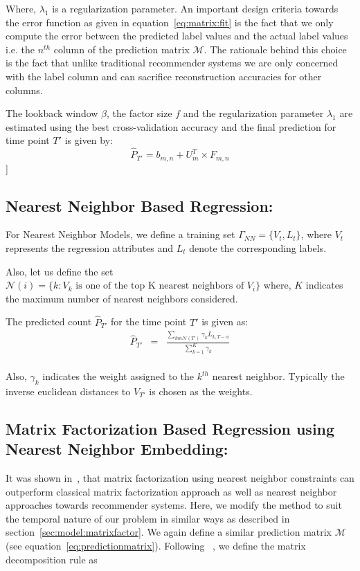 Where, $\lambda_1$ is a regularization parameter. An important design criteria towards
the error function as given in equation~\ref{eq:matrix:fit} is the fact that we only compute the error
between the predicted label values and the actual label values i.e. the $n^{th}$ column of the prediction 
matrix $\mathcal{M}$. The rationale behind this choice is the fact that unlike traditional recommender 
systems we are only concerned with the label column and can sacrifice reconstruction accuracies for other 
columns. 

The lookback window $\beta$, the factor size $f$ and the regularization parameter $\lambda_1$ 
are estimated using the best cross-validation accuracy 
and the final prediction for time point $T'$ is given by:
\[\widehat{P}_{T'} = b_{m,n} + U_m^T \times F_{m,n} \]]

\subsection{\label{sec:model:nearestneighbor} Nearest Neighbor Based Regression:}
For Nearest Neighbor Models, we define a training set $\Gamma_{NN}
= \lbrace V_t, L_t \rbrace$, where $V_t$ represents the regression attributes
and $L_t$ denote the corresponding labels.

Also, let us define the set 
$\mathcal{N}(i) = \lbrace k : \mbox{$V_k$ is one of the top  K nearest neighbors of $V_{i}$} \rbrace$ 
where, $K$ indicates the maximum number of nearest neighbors considered.


The predicted count $\widehat{P}_{T'}$ for the time point $T'$ is given as:
\begin{equation} \label{eq:nearestneighbor:pred}
  \begin{array}{lcl}
    \widehat{P}_{T'} & = & \frac{\sum\limits_{k in \mathcal{N}(T')} \gamma_{k}L_{k,T - \alpha}}
    {\sum\limits_{k=1}^{K} \gamma_{k}}\\
  \end{array}
\end{equation}

Also, $\gamma_k$ indicates the weight assigned to the $k^{th}$ nearest neighbor.
Typically the inverse euclidean distances to $V_{T'}$ is chosen as the weights.

\subsection{\label{sec:model:nearestmatrix} Matrix Factorization Based
Regression using Nearest Neighbor Embedding:}
It was shown in~\cite{koren2008factor},  that matrix factorization using nearest neighbor constraints can
outperform classical matrix factorization approach as well as nearest neighbor approaches towards
recommender systems. Here, we modify the method to suit the temporal nature of our problem in similar ways 
as described in section~\ref{sec:model:matrixfactor}. We again define a similar prediction matrix $\mathcal{M}$ 
(see equation~\ref{eq:predictionmatrix}). Following ~\cite{koren2008factor}, we define the 
matrix decomposition rule as 

